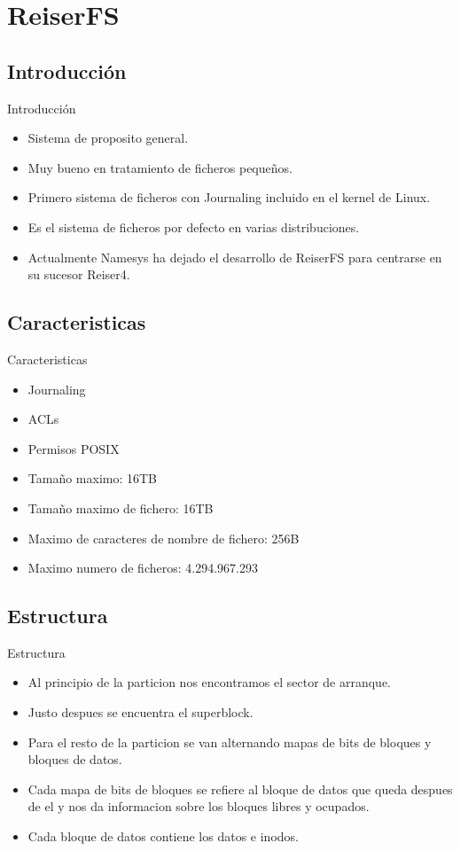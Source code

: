 \section{ReiserFS}
\subsection{Introducción}
\begin{frame}{Introducción}
  \begin{itemize}
    \item Sistema de proposito general.
    \item Muy bueno en tratamiento de ficheros pequeños.
    \item Primero sistema de ficheros con Journaling incluido en el kernel de Linux.
    \item Es el sistema de ficheros por defecto en varias distribuciones.
    \item Actualmente Namesys ha dejado el desarrollo de ReiserFS para centrarse en su sucesor Reiser4.
  \end{itemize}
\end{frame}

\subsection{Caracteristicas}
\begin{frame}{Caracteristicas}
  \begin{itemize}
    \item Journaling
    \item ACLs
    \item Permisos POSIX
    \item Tamaño maximo: 16TB
    \item Tamaño maximo de fichero: 16TB
    \item Maximo de caracteres de nombre de fichero: 256B
    \item Maximo numero de ficheros: 4.294.967.293
  \end{itemize}
\end{frame}

\subsection{Estructura}
\begin{frame}{Estructura}
  \begin{itemize}
    \item Al principio de la particion nos encontramos el sector de arranque.
    \item Justo despues se encuentra el superblock.
    \item Para el resto de la particion se van alternando mapas de bits de bloques y bloques de datos.
    \item Cada mapa de bits de bloques se refiere al bloque de datos que queda despues de el y nos da informacion sobre los bloques libres  y ocupados.
    \item Cada bloque de datos contiene los datos e inodos.
  \end{itemize}
\end{frame}

